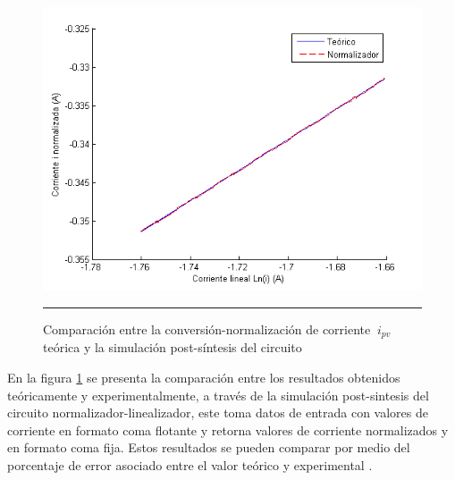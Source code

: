   \begin{figure}[H]
  \centering
    \includegraphics[scale=0.8]{./Normalizador_I.png}
    \rule{35em}{0.5pt}
  \caption[Comparación entre la conversión-normalización de corriente $\ i_{pv}$ teórica y la simulación post-síntesis del circuito]{Comparación entre la conversión-normalización de corriente $\ i_{pv}$ teórica y la simulación post-síntesis del circuito}
  \label{fig:NORMI}
\end{figure}

\newpage

En la figura \ref{fig:NORMI} se presenta la comparación entre los resultados obtenidos teóricamente y experimentalmente, a través de la simulación post-sintesis del circuito normalizador-linealizador, este toma datos de entrada con valores de corriente en formato coma flotante y retorna valores de corriente normalizados y en formato coma fija. Estos resultados se pueden comparar por medio del porcentaje de error asociado entre el valor teórico y experimental .  

